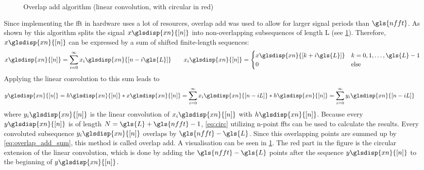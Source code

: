 \documentclass[12pt,a4paper,parskip=full,abstract=true,BCOR=12mm]{scrreprt}
\newcommand{\XN}{\glsdisp{xn}{[n]}}
\begin{document}
\begin{figure}[htb]
    \caption[Overlap add algorithm]{Overlap add algorithm (linear convolution, with circular in red)}
    \label{fig:overlap_add}
\end{figure}

Since implementing the \gls{fft} in hardware uses a lot of resources, overlap add
was used to allow for larger signal periods than $\gls{nfft}$. As shown by \cite{schaums_2011}
this algorithm splits the signal $x\XN$ into non-overlapping
subsequences of length \gls{L} (see \cref{fig:overlap_add}).
Therefore, $x\XN$ can be expressed by a sum of shifted finite-length sequences:
\begin{equation}
    \label{eq:sum_seq} x\XN = \sum_{i=0}^{\infty} x_i\glsdisp{xn}{[n-i\gls{L}]} \qquad x_i\XN =\begin{cases}
        x\glsdisp{xn}{[k+i\gls{L}]} & k = 0, 1, \ldots, \gls{L}-1\\
        0 & \text{else} \end{cases}
\end{equation}
Applying the linear convolution to this sum leads to
\begin{equation}
    \begin{split}\label{eq:overlap_add_sum}
        y\XN = h\XN * x\XN & = \sum_{i=0}^{\infty} x_i\glsdisp{xn}{[n-iL]} * h\XN = \sum_{i=0}^{\infty} y_i\glsdisp{xn}{[n-iL]}
    \end{split}
\end{equation}
where $y_i\XN$ is the linear convolution of $x_i\XN$ with $h\XN$. Because every $y\XN$ is of length
$N = \gls{L} + \gls{nfft} -1$, \cref{eq:circ} utilizing n-point \glspl{fft} can be used to calculate the results.
Every convoluted subsequence $y_i\XN$ overlaps by $\gls{nfft} - \gls{L}$. Since this overlapping
points are summed up by \cref{eq:overlap_add_sum}, this method is called overlap
add. A visualisation can be seen in \cref{fig:overlap_add}. The red part in the figure
is the circular extension of the linear convolution, which is done by adding the
$\gls{nfft} - \gls{L}$ points after the sequence $y\XN$ to the beginning of $y\XN$.
\end{document}
